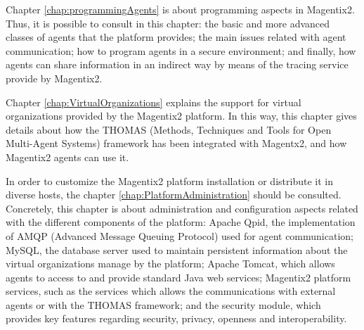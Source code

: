 Chapter  \ref{chap:programmingAgents} is about programming aspects in Magentix2. Thus, it is possible to consult in this chapter:  the basic and more advanced classes of agents that the platform provides; the main issues related with agent communication; how to program agents in a secure environment; and finally, how agents can share information in an indirect way by means of the tracing service provide by Magentix2.
 



Chapter \ref{chap:VirtualOrganizations} explains the support for virtual organizations provided by the Magentix2 platform. In this way, this chapter gives details about how the \textsc{THOMAS} (Methods, Techniques and Tools for Open Multi-Agent Systems) framework has been integrated with Magentx2, and how Magentix2 agents can use it. 

In order to customize the Magentix2 platform installation or distribute it in diverse hosts, the chapter \ref{chap:PlatformAdministration} should be consulted. Concretely, this chapter is about administration and configuration aspects related with the different components of the platform: Apache Qpid, the implementation of AMQP (Advanced Message Queuing Protocol) used for agent communication; MySQL, the database server used to maintain persistent information about the virtual organizations manage by the platform; Apache Tomcat, which allows agents to access to and provide standard Java web services; Magentix2 platform services, such as the services which allows the communications with external agents or with the \textsc{THOMAS} framework; and the security module, which provides key features regarding security, privacy, openness and interoperability.

 

   

  
